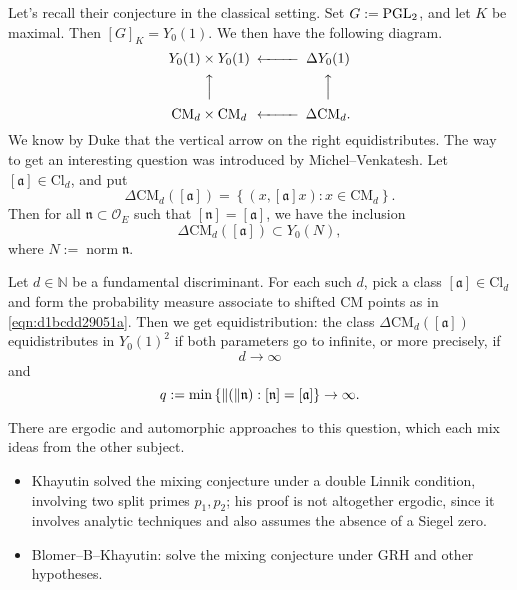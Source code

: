 \documentclass[reqno]{amsart} 
\begin{document}
Let's recall their conjecture in the classical setting.  Set $G := \operatorname{PGL}_2$, and let $K$ be maximal.  Then $[G]_K = Y_0 (1) $.  We then have the following diagram.
\begin{equation*}
  \begin{CD}         
    Y_0(1) \times Y_0(1) @<<< \Delta Y_0(1)\\
    @AAA  @AAA \\
    \mathrm{CM}_d \times \mathrm{CM}_d  @<<< \Delta \mathrm{CM}_d.\\
  \end{CD}
\end{equation*}
We know by Duke that the vertical arrow on the right equidistributes.  The way to get an interesting question was introduced by Michel--Venkatesh.  Let $[\mathfrak{a} ] \in \mathrm{Cl}_d$, and put
\begin{equation}\label{eqn:d1bcdd29051a}
  \Delta \mathrm{CM}_d ([\mathfrak{a} ])
  = \left\{ (x, [\mathfrak{a} ] x) : x \in \mathrm{CM}_d \right\}.
\end{equation}
Then for all $\mathfrak{n} \subset \mathcal{O}_E $ such that $[\mathfrak{n} ] = [\mathfrak{a} ]$, we have the inclusion
\begin{equation*}
  \Delta \mathrm{CM }_d ([\mathfrak{a} ])
  \subset Y_0 (N),
\end{equation*}
where $N := \operatorname{norm} \mathfrak{n}$.
\begin{conjecture}
  Let $d \in \mathbb{N} $ be a fundamental discriminant.  For each such $d$, pick a class $[\mathfrak{a} ] \in \mathrm{Cl}_d $ and form the probability measure associate to shifted CM points as in \eqref{eqn:d1bcdd29051a}.  Then we get equidistribution: the class $\Delta \mathrm{CM }_d ([\mathfrak{a} ]) $ equidistributes in $Y_0 (1)^2 $ if both parameters go to infinite, or more precisely, if
  \begin{equation*}
    d \rightarrow \infty
  \end{equation*}
  and
  \begin{equation*}
    q := \min \left\{ \lVert(\rVert\mathfrak{n} ) : [\mathfrak{n} ] = [\mathfrak{a} ] \right\} \rightarrow \infty.
  \end{equation*}
\end{conjecture}
There are ergodic and automorphic approaches to this question, which each mix ideas from the other subject.
\begin{itemize}
\item Khayutin solved the mixing conjecture under a double Linnik condition, involving two split primes $p_1, p_2 $; his proof is not altogether ergodic, since it involves analytic techniques and also assumes the absence of a Siegel zero.
\item Blomer--B--Khayutin: solve the mixing conjecture under GRH and other hypotheses.
\end{itemize}
\end{document}
